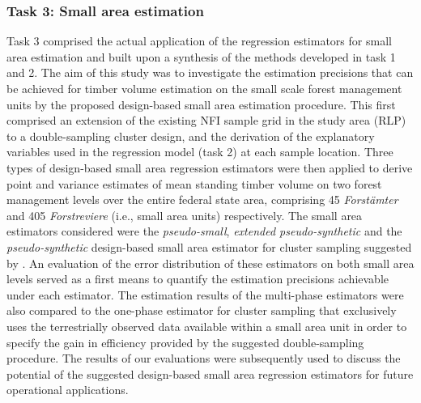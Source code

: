 
\subsubsection{Task 3: Small area estimation} %


Task 3 comprised the actual application of the regression estimators for small area estimation and built upon a synthesis of the methods developed in task 1 and 2. The aim of this study was to investigate the estimation precisions that can be achieved for timber volume estimation on the small scale forest management units by the proposed design-based small area estimation procedure. This first comprised an extension of the existing NFI sample grid in the study area (RLP) to a double-sampling cluster design, and the derivation of the explanatory variables used in the regression model (task 2) at each sample location. Three types of design-based small area regression estimators were then applied to derive point and variance estimates of mean standing timber volume on two forest management levels over the entire federal state area, comprising 45 \textit{Forst{\"a}mter} and 405 \textit{Forstreviere} (i.e., small area units) respectively. The small area estimators considered were the \textit{pseudo-small}, \textit{extended pseudo-synthetic} and the \textit{pseudo-synthetic} design-based small area estimator for cluster sampling suggested by \citet{mandallaz2013a, mandallaz2013b}. An evaluation of the error distribution of these estimators on both small area levels served as a first means to quantify the estimation precisions achievable under each estimator. The estimation results of the multi-phase estimators were also compared to the one-phase estimator for cluster sampling that exclusively uses the terrestrially observed data available within a small area unit in order to specify the gain in efficiency provided by the suggested double-sampling procedure. The results of our evaluations were subsequently used to discuss the potential of the suggested design-based small area regression estimators for future operational applications.

